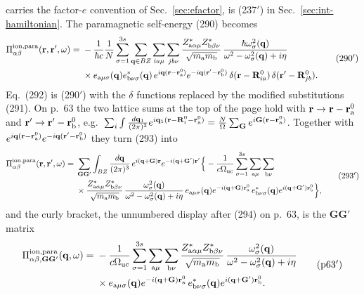 \documentclass[11pt]{article}
\begin{document}
carries the factor-$e$ convention of Sec.~\ref{sec:efactor}, is (237$'$) in Sec.~\ref{sec:int-hamiltonian}.
The paramagnetic self-energy (290) becomes
\begin{equation*}
\begin{split}
\Pi^{\rm ion,para}_{\alpha\beta}(\mathbf r,\mathbf r',\omega)={}&-\frac{1}{\hbar c}\frac1N\sum_{\sigma=1}^{3s}
\sum_{\mathbf q\in BZ}\sum_{ia\mu}\sum_{jb\nu}\frac{Z^*_{{\rm a}\alpha\mu}Z^*_{{\rm b}\beta\nu}}{\sqrt{m_{\rm a}m_{\rm b}}}\,
\frac{\hbar\omega^2_\sigma(\mathbf q)}{\omega^2-\omega^2_\sigma(\mathbf q)+i\eta}\\
&\times e_{{\rm a}\mu\sigma}(\mathbf q)e^*_{{\rm b}\nu\sigma}(\mathbf q)\,
e^{i\mathbf q(\mathbf r-\mathbf r^0_{\rm a})}e^{-i\mathbf q(\mathbf r'-\mathbf r^0_{\rm b})}\,
\delta(\mathbf r-\mathbf R^0_{ia})\,\delta(\mathbf r'-\mathbf R^0_{jb}).
\end{split}
\tag{290$'$}
\end{equation*}
Eq.~(292) is (290$'$) with the $\delta$ functions replaced by the modified substitutions (291). On p.~63
the two lattice sums at the top of the page hold with $\mathbf r\to\mathbf r-\mathbf r^0_{\rm a}$ and
$\mathbf r'\to\mathbf r'-\mathbf r^0_{\rm b}$, e.g.\
$\sum_i\int\frac{d\mathbf q_1}{(2\pi)^3}e^{i\mathbf q_1(\mathbf r-\mathbf R^0_i-\mathbf r^0_{\rm a})}
=\frac N\Omega\sum_{\mathbf G}e^{i\mathbf G(\mathbf r-\mathbf r^0_{\rm a})}$. Together with
$e^{i\mathbf q(\mathbf r-\mathbf r^0_{\rm a})}e^{-i\mathbf q(\mathbf r'-\mathbf r^0_{\rm b})}$ they turn (293) into
\begin{equation*}
\begin{split}
\Pi^{\rm ion,para}_{\alpha\beta}(\mathbf r,\mathbf r',\omega)={}&\sum_{\mathbf G\mathbf G'}\int_{BZ}
\frac{d\mathbf q}{(2\pi)^3}\,e^{i(\mathbf q+\mathbf G)\mathbf r}e^{-i(\mathbf q+\mathbf G')\mathbf r'}
\Big\{-\frac{1}{c\Omega_{\rm uc}}\sum_{\sigma=1}^{3s}\sum_{{\rm a}\mu}\sum_{{\rm b}\nu}\\
&\times\frac{Z^*_{{\rm a}\alpha\mu}Z^*_{{\rm b}\beta\nu}}{\sqrt{m_{\rm a}m_{\rm b}}}\,
\frac{\omega^2_\sigma(\mathbf q)}{\omega^2-\omega^2_\sigma(\mathbf q)+i\eta}\,
e_{{\rm a}\mu\sigma}(\mathbf q)e^{-i(\mathbf q+\mathbf G)\mathbf r^0_{\rm a}}\,
e^*_{{\rm b}\nu\sigma}(\mathbf q)e^{i(\mathbf q+\mathbf G')\mathbf r^0_{\rm b}}\Big\},
\end{split}
\tag{293$'$}
\end{equation*}
and the curly bracket, the unnumbered display after (294) on p.~63, is the $\mathbf G\mathbf G'$ matrix
\begin{equation*}
\begin{split}
\Pi^{\rm ion,para}_{\alpha\beta,\mathbf G\mathbf G'}(\mathbf q,\omega)={}&-\frac{1}{c\Omega_{\rm uc}}
\sum_{\sigma=1}^{3s}\sum_{{\rm a}\mu}\sum_{{\rm b}\nu}\frac{Z^*_{{\rm a}\alpha\mu}Z^*_{{\rm b}\beta\nu}}
{\sqrt{m_{\rm a}m_{\rm b}}}\,\frac{\omega^2_\sigma(\mathbf q)}{\omega^2-\omega^2_\sigma(\mathbf q)+i\eta}\\
&\times e_{{\rm a}\mu\sigma}(\mathbf q)e^{-i(\mathbf q+\mathbf G)\mathbf r^0_{\rm a}}\,
e^*_{{\rm b}\nu\sigma}(\mathbf q)e^{i(\mathbf q+\mathbf G')\mathbf r^0_{\rm b}}.
\end{split}
\tag{p63$'$}
\end{equation*}
\end{document}
